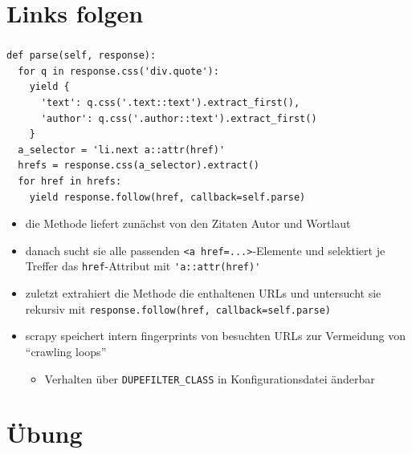 \documentclass{beamer}
\begin{document}
\section{Links folgen}
\begin{frame}
	\frametitle{\insertsection{}}
	\begin{lstlisting}
def parse(self, response):
  for q in response.css('div.quote'):
    yield {
      'text': q.css('.text::text').extract_first(),
      'author': q.css('.author::text').extract_first()
    }
  a_selector = 'li.next a::attr(href)'
  hrefs = response.css(a_selector).extract()  
  for href in hrefs:    
    yield response.follow(href, callback=self.parse)
	\end{lstlisting}
	\begin{itemize}
		\item die Methode liefert zunächst von den Zitaten Autor und Wortlaut
		\item danach sucht sie alle passenden \lstinline|<a href=...>|-Elemente und selektiert je Treffer das \lstinline|href|-Attribut mit \lstinline|'a::attr(href)'| 
		
		\framebreak
		
		\item zuletzt extrahiert die Methode die enthaltenen URLs und untersucht sie rekursiv mit \lstinline|response.follow(href, callback=self.parse)| 
		\item scrapy speichert intern fingerprints von besuchten URLs zur Vermeidung von ``crawling loops'' \begin{itemize}
			\item Verhalten über \lstinline|DUPEFILTER_CLASS| in Konfigurationsdatei änderbar
		\end{itemize}
	\end{itemize}
\end{frame}


\section{Übung}
\end{document}
